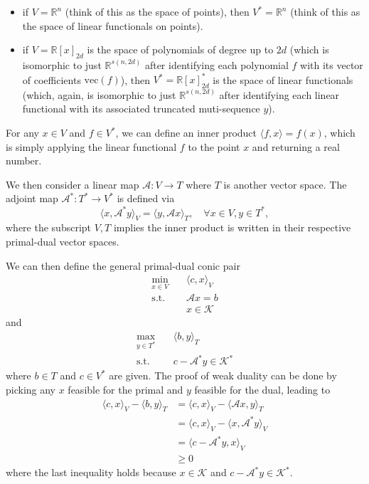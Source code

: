 \documentclass[
]{book}
\theoremstyle{definition}
\theoremstyle{definition}
\theoremstyle{definition}
\theoremstyle{definition}
\theoremstyle{remark}
\begin{document}
\begin{itemize}
\item
  if \(V=\mathbb{R}^{n}\) (think of this as the space of points), then \(V^* = \mathbb{R}^{n}\) (think of this as the space of linear functionals on points).
\item
  if \(V = \mathbb{R}[x]_{2d}\) is the space of polynomials of degree up to \(2d\) (which is isomorphic to just \(\mathbb{R}^{s(n,2d)}\) after identifying each polynomial \(f\) with its vector of coefficients \(\mathrm{vec}(f)\)), then \(V^* = \mathbb{R}[x]_{2d}^*\) is the space of linear functionals (which, again, is isomorphic to just \(\mathbb{R}^{s(n,2d)}\) after identifying each linear functional with its associated truncated muti-sequence \(y\)).
\end{itemize}

For any \(x \in V\) and \(f \in V^*\), we can define an inner product \(\langle f, x \rangle = f(x)\), which is simply applying the linear functional \(f\) to the point \(x\) and returning a real number.

We then consider a linear map \(\mathcal{A}: V \rightarrow T\) where \(T\) is another vector space. The adjoint map \(\mathcal{A}^*: T^* \rightarrow V^*\) is defined via
\[
\langle x, \mathcal{A}^* y \rangle_V = \langle y, \mathcal{A}x \rangle_T, \quad \forall x \in V, y \in T^*,
\]
where the subscript \(V,T\) implies the inner product is written in their respective primal-dual vector spaces.

We can then define the general primal-dual conic pair
\begin{equation}
\boxed{
\begin{split}
\min_{x \in V} & \quad \langle c, x \rangle_V \\
\mathrm{s.t.}& \quad \mathcal{A}x = b \\
& \quad x \in \mathcal{K}
\end{split}}
\label{eq:conic-primal}
\end{equation}
and
\begin{equation}
\boxed{
\begin{split}
\max_{y \in T^*} & \quad \langle b, y \rangle_T \\
\mathrm{s.t.}& \quad c - \mathcal{A}^* y \in \mathcal{K}^*
\end{split}}
\label{eq:conic-dual}
\end{equation}
where \(b \in T\) and \(c \in V^*\) are given. The proof of weak duality can be done by picking any \(x\) feasible for the primal and \(y\) feasible for the dual, leading to
\begin{equation}
\begin{split}
\langle c, x \rangle_V - \langle b, y \rangle_T & = \langle c, x \rangle_V - \langle \mathcal{A}x, y \rangle_T \\
& = \langle c, x \rangle_V - \langle x, \mathcal{A}^* y \rangle_V \\
& = \langle c - \mathcal{A}^* y, x \rangle_V \\
& \geq 0
\end{split}
\end{equation}
where the last inequality holds because \(x \in \mathcal{K}\) and \(c - \mathcal{A}^* y \in \mathcal{K}^*\).
\end{document}
